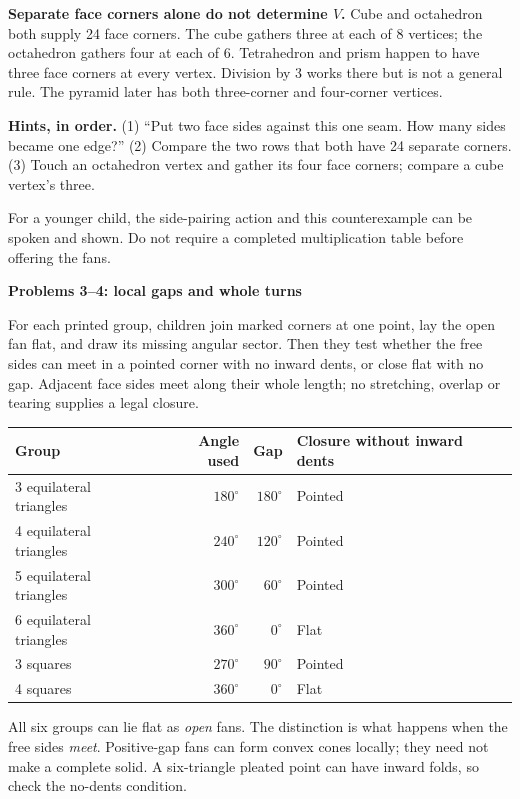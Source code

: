 \documentclass[11pt,letterpaper]{article}
\newcommand{\titleline}[1]{\par{\Large\bfseries #1}\par\vspace{4pt}}
\newcommand{\sub}[1]{\par\vspace{3pt}{\bfseries #1}\par}
\newcommand{\hints}[3]{\textbf{Hints, in order.} (1) #1 (2) #2 (3) #3\par}
\newcommand{\degc}{^{\circ}}
\begin{document}
\textbf{Separate face corners alone do not determine $V$.} Cube and octahedron both supply 24 face corners. The cube gathers three at each of 8 vertices; the octahedron gathers four at each of 6. Tetrahedron and prism happen to have three face corners at every vertex. Division by 3 works there but is not a general rule. The pyramid later has both three-corner and four-corner vertices.

\hints{``Put two face sides against this one seam. How many sides became one edge?''}{Compare the two rows that both have 24 separate corners.}{Touch an octahedron vertex and gather its four face corners; compare a cube vertex's three.}
For a younger child, the side-pairing action and this counterexample can be spoken and shown. Do not require a completed multiplication table before offering the fans.

\newpage
\titleline{Problems 3--4: local gaps and whole turns}
\sub{Problem 3 / student p.3 / fan core at all tables}
For each printed group, children join marked corners at one point, lay the open fan flat, and draw its missing angular sector. Then they test whether the free sides can meet in a pointed corner with no inward dents, or close flat with no gap. Adjacent face sides meet along their whole length; no stretching, overlap or tearing supplies a legal closure.

\begin{center}
\begin{tabular}{|l|r|r|l|}\hline
Group & Angle used & Gap & Closure without inward dents\\\hline
3 equilateral triangles & $180\degc$ & $180\degc$ & Pointed\\
4 equilateral triangles & $240\degc$ & $120\degc$ & Pointed\\
5 equilateral triangles & $300\degc$ & $60\degc$ & Pointed\\
6 equilateral triangles & $360\degc$ & $0\degc$ & Flat\\
3 squares & $270\degc$ & $90\degc$ & Pointed\\
4 squares & $360\degc$ & $0\degc$ & Flat\\\hline
\end{tabular}
\end{center}
All six groups can lie flat as \emph{open} fans. The distinction is what happens when the free sides \emph{meet}. Positive-gap fans can form convex cones locally; they need not make a complete solid. A six-triangle pleated point can have inward folds, so check the no-dents condition.
\end{document}
